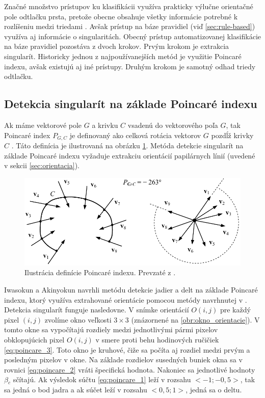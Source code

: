   Značné množstvo prístupov ku klasifikácii využíva prakticky výlučne orientačné pole odtlačku prsta, pretože obecne obsahuje všetky informácie potrebné
  k rozlíšeniu medzi triedami \cite{Handbook}. Avšak prístup na báze pravidiel (viď \ref{sec:rule-based}) využíva aj informácie o singularitách.
  Obecný prístup automatizovanej klasifikácie na báze pravidiel pozostáva z dvoch krokov. Prvým krokom je extrakcia singularít. Historicky jednou
  z najpoužívanejších metód je využitie Poincaré indexu, avšak existujú aj iné prístupy. Druhým krokom je samotný odhad triedy odtlačku.

  \subsection{Detekcia singularít na základe Poincaré indexu}
  Ak máme vektorové pole $G$ a krivku $C$ vsadenú do vektorového poľa $G$, tak Poincaré index $P_{G,C}$ je definovaný ako celková rotácia vektorov $G$ pozdĺž
  krivky $C$ \cite{Handbook}. Táto definícia je ilustrovaná na obrázku \ref{obr:poincare_index}. Metóda detekcie singularít na základe Poincaré indexu vyžaduje
  extrakciu orientácií papilárnych línií (uvedené v sekcii \ref{sec:orientacia}).

  \begin{figure}[h]
    \centering
    \includegraphics[width=0.65\linewidth]{obrazky-figures/poincare_index.png}
    \caption{Ilustrácia definície Poincaré indexu. Prevzaté z \cite{Handbook}.}
    \label{obr:poincare_index}
  \end{figure}

  Iwasokun a Akinyokun \cite{iwasokun2014singularities} navrhli metódu detekcie jadier a delt na základe Poincaré indexu, ktorý využíva extrahované orientácie
  pomocou metódy navrhnutej v \cite{Hong}. Detekcia singularít funguje nasledovne. V snímke orientácií $O(i,j)$ pre každý pixel $(i,j)$ zvolíme
  okno veľkosti $3\times{}3$ (znázornené na \ref{obr:okno_orientacie}). V tomto okne sa vypočítajú rozdiely medzi jednotlivými pármi pixelov
  obklopujúcich pixel $O(i,j)$ v smere proti behu hodinových ručičiek \ref{eq:poincare_3}. Toto okno je kruhové, čiže sa počíta aj rozdiel medzi prvým
  a posledným pixelov v okne. Na základe rozdielov susedných buniek okna sa v rovnici \ref{eq:poincare_2} vráti špecifická hodnota. Nakoniec sa jednotlivé
  hodnoty $\beta{}_c$ sčítajú. Ak výsledok súčtu \ref{eq:poincare_1} leží v rozsahu $<-1;-0,5>$, tak sa jedná o bod jadra a ak súčet leží v rozsahu $<0,5;1>$,
  jedná sa o deltu.

